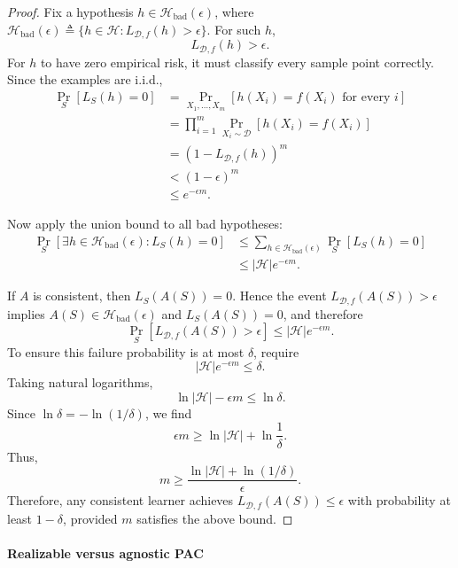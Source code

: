 \documentclass[11pt,a4paper]{article}
\theoremstyle{definition}
\begin{document}
\begin{proof}
Fix a hypothesis $h \in \mathcal{H}_{\text{bad}}(\epsilon)$, where $\mathcal{H}_{\text{bad}}(\epsilon) \triangleq \{ h \in \mathcal{H} : L_{\mathcal{D},f}(h) > \epsilon \}$. For such $h$,
\[
L_{\mathcal{D},f}(h) > \epsilon.
\]
For $h$ to have zero empirical risk, it must classify every sample point correctly. Since the examples are i.i.d.,
\begin{align*}
\Pr_{S}[L_S(h) = 0] &= \Pr_{X_1, \dots, X_m}[h(X_i) = f(X_i) \text{ for every } i] \\
&= \prod_{i=1}^m \Pr_{X_i \sim \mathcal{D}}[h(X_i) = f(X_i)] \\
&= (1 - L_{\mathcal{D},f}(h))^m \\
&< (1 - \epsilon)^m \\
&\leq e^{-\epsilon m}.
\end{align*}

Now apply the union bound to all bad hypotheses:
\begin{align*}
\Pr_{S}[\exists h \in \mathcal{H}_{\text{bad}}(\epsilon) : L_S(h) = 0] 
&\leq \sum_{h \in \mathcal{H}_{\text{bad}}(\epsilon)} \Pr_{S}[L_S(h) = 0] \\
&\leq |\mathcal{H}|e^{-\epsilon m}.
\end{align*}

If \(A\) is consistent, then \(L_S(A(S)) = 0\). Hence the event \(L_{\mathcal{D},f}(A(S)) > \epsilon\)
implies \(A(S) \in \mathcal{H}_{\text{bad}}(\epsilon)\) and \(L_S(A(S)) = 0\), and therefore
\[
\Pr_{S}[L_{\mathcal{D},f}(A(S)) > \epsilon] \leq |\mathcal{H}|e^{-\epsilon m}.
\]
To ensure this failure probability is at most $\delta$, require
\[
|\mathcal{H}|e^{-\epsilon m} \leq \delta.
\]
Taking natural logarithms,
\[
\ln |\mathcal{H}| - \epsilon m \leq \ln \delta.
\]
Since $\ln \delta = -\ln(1/\delta)$, we find
\[
\epsilon m \geq \ln |\mathcal{H}| + \ln \frac{1}{\delta}.
\]
Thus,
\[
m \geq \frac{\ln |\mathcal{H}| + \ln(1/\delta)}{\epsilon}.
\]
Therefore, any consistent learner achieves \(L_{\mathcal{D},f}(A(S)) \leq \epsilon\) with probability at least \(1 - \delta\), provided \(m\) satisfies the above bound.
\end{proof}

\paragraph{Realizable versus agnostic PAC}

\noindent
\end{document}
